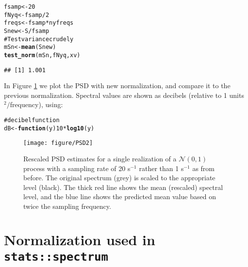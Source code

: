\documentclass[11pt]{article}\usepackage{graphicx, color}
\makeatletter
\def\maxwidth{ %
  \ifdim\Gin@nat@width>\linewidth
    \linewidth
  \else
    \Gin@nat@width
  \fi
}
\newcommand{\hlfunctioncall}[1]{\textcolor[rgb]{0.501960784313725,0,0.329411764705882}{\textbf{#1}}}%
\newcommand{\hlcomment}[1]{\textcolor[rgb]{0.180392156862745,0.6,0.341176470588235}{#1}}%
\newenvironment{kframe}{%
 \def\at@end@of@kframe{}%
 \ifinner\ifhmode%
  \def\at@end@of@kframe{\end{minipage}}%
  \begin{minipage}{\columnwidth}%
 \fi\fi%
 \def\FrameCommand##1{\hskip\@totalleftmargin \hskip-\fboxsep
 \colorbox{shadecolor}{##1}\hskip-\fboxsep
     \hskip-\linewidth \hskip-\@totalleftmargin \hskip\columnwidth}%
 \MakeFramed {\advance\hsize-\width
   \@totalleftmargin\z@ \linewidth\hsize
   \@setminipage}}%
 {\par\unskip\endMakeFramed%
 \at@end@of@kframe}
\newenvironment{knitrout}{}{} %
\newcommand{\Rcmd}[1]{\texttt{#1}}
\makeatother
\begin{document}
\begin{knitrout}
\color{fgcolor}\begin{kframe}
\begin{alltt}
fsamp <- 20
fNyq <- fsamp/2
freqs <- fsamp * nyfreqs
Snew <- S/fsamp
\hlcomment{# Test variance crudely}
mSn <- \hlfunctioncall{mean}(Snew)
\hlfunctioncall{test_norm}(mSn, fNyq, xv)
\end{alltt}
\begin{verbatim}
## [1] 1.001
\end{verbatim}
\end{kframe}
\end{knitrout}


In Figure \ref{fig:psdsamp} we
plot the PSD with new normalization, and compare it to
the previous normalization.
Spectral values are shown as
decibels (relative to 1 units$^2/$frequency), using:

\begin{knitrout}
\color{fgcolor}\begin{kframe}
\begin{alltt}
\hlcomment{# decibel function}
dB <- \hlfunctioncall{function}(y) 10 * \hlfunctioncall{log10}(y)
\end{alltt}
\end{kframe}
\end{knitrout}

\begin{figure}[htb!]
\begin{center}
\begin{knitrout}
\color{fgcolor}
\texttt{[image: figure/PSD2]} 

\end{knitrout}

\caption{Rescaled PSD estimates for a single realization of a 
$\mathcal{N}(0,1)$ process with a sampling rate of 20 s$^{-1}$ rather
than 1 s$^{-1}$ as from before.  
The original spectrum (grey) is scaled to the appropriate level
(black).
The thick red line shows the mean (rescaled) spectral level, and the
blue line shows the predicted mean value based on twice the sampling
frequency.}
\label{fig:psdsamp}
\end{center}
\end{figure}

\section{Normalization used in \Rcmd{stats::spectrum}}
\end{document}
